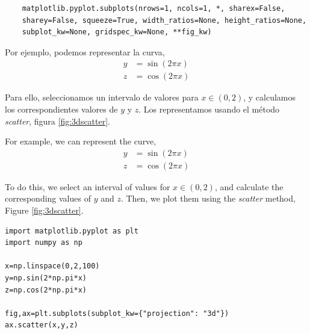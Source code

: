 \begin{verbatim}
    matplotlib.pyplot.subplots(nrows=1, ncols=1, *, sharex=False,
    sharey=False, squeeze=True, width_ratios=None, height_ratios=None, 
    subplot_kw=None, gridspec_kw=None, **fig_kw)
\end{verbatim}
\begin{paracol}{2}

Por ejemplo, podemos representar la curva,
\begin{align*}
y&=\sin(2\pi x)\\
z&=\cos(2\pi x)
\end{align*}

Para ello, seleccionamos un intervalo de valores para $x \in (0,2)$, y calculamos los correspondientes valores de $y$ y $z$. Los representamos usando el método \textit{scatter}, figura \ref{fig:3dscatter}.

\switchcolumn
For example, we can represent the curve,
\begin{align*}
y&=\sin(2\pi x)\\
z&=\cos(2\pi x)
\end{align*}

To do this, we select an interval of values for $x \in (0,2)$, and calculate the corresponding values of $y$ and $z$. Then, we plot them using the \textit{scatter} method, Figure \ref{fig:3dscatter}.

\end{paracol}

\begin{verbatim}
import matplotlib.pyplot as plt
import numpy as np

x=np.linspace(0,2,100)
y=np.sin(2*np.pi*x)
z=np.cos(2*np.pi*x)

fig,ax=plt.subplots(subplot_kw={"projection": "3d"})
ax.scatter(x,y,z)  
\end{verbatim}



